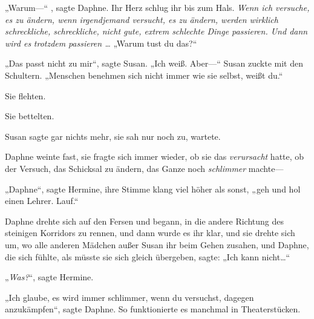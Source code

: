 „Warum—“ , sagte Daphne. Ihr Herz schlug ihr bis zum Hals. \emph{Wenn ich versuche, es zu ändern, wenn irgendjemand versucht, es zu ändern, werden wirklich schreckliche, schreckliche, nicht gute, extrem schlechte Dinge passieren. Und dann wird es} \emph{trotzdem} \emph{passieren …} „Warum tust du das?“

„Das passt nicht zu mir“, sagte Susan. „Ich weiß. Aber—“ Susan zuckte mit den Schultern. „Menschen benehmen sich nicht immer wie sie selbst, weißt du.“

Sie flehten.

Sie bettelten.

Susan sagte gar nichts mehr, sie sah nur noch zu, wartete.

Daphne weinte fast, sie fragte sich immer wieder, ob sie das \emph{verursacht} hatte, ob der Versuch, das Schicksal zu ändern, das Ganze noch \emph{schlimmer} machte—

„Daphne“, sagte Hermine, ihre Stimme klang viel höher als sonst, „geh und hol einen Lehrer. Lauf.“

Daphne drehte sich auf den Fersen und begann, in die andere Richtung des steinigen Korridors zu rennen, und dann wurde es ihr klar, und sie drehte sich um, wo alle anderen Mädchen außer Susan ihr beim Gehen zusahen, und Daphne, die sich fühlte, als müsste sie sich gleich übergeben, sagte: „Ich kann nicht…“

„\emph{Was?}“, sagte Hermine.

„Ich glaube, es wird immer schlimmer, wenn du versuchst, dagegen anzukämpfen“, sagte Daphne. So funktionierte es manchmal in Theaterstücken.

